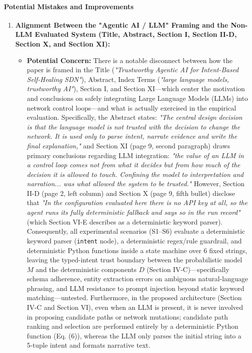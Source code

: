 \documentclass[11pt,a4paper]{article}
\begin{document}
\paragraph{Potential Mistakes and Improvements}
\begin{enumerate}[leftmargin=1.6em,itemsep=3pt]
\item \textbf{Alignment Between the "Agentic AI / LLM" Framing and the Non-LLM Evaluated System (Title, Abstract, Section I, Section II-D, Section X, and Section XI):}
\begin{itemize}[leftmargin=1.8em,itemsep=2pt]
\item \textbf{Potential Concern:} There is a notable disconnect between how the paper is framed in the Title (\emph{"Trustworthy Agentic AI for Intent-Based Self-Healing SDN"}), Abstract, Index Terms (\emph{"large language models, trustworthy AI"}), Section I, and Section XI—which center the motivation and conclusions on safely integrating Large Language Models (LLMs) into network control loops—and what is actually exercised in the empirical evaluation. Specifically, the Abstract states: \emph{"The central design decision is that the language model is not trusted with the decision to change the network. It is used only to parse intent, narrate evidence and write the final explanation,"} and Section XI (page 9, second paragraph) draws primary conclusions regarding LLM integration: \emph{"the value of an LLM in a control loop comes not from what it decides but from how much of the decision it is allowed to touch. Confining the model to interpretation and narration... was what allowed the system to be trusted."} However, Section II-D (page 2, left column) and Section X (page 9, fifth bullet) disclose that \emph{"In the configuration evaluated here there is no API key at all, so the agent runs its fully deterministic fallback and says so in the run record"} (which Section VI-E describes as a deterministic keyword parser). Consequently, all experimental scenarios (S1–S6) evaluate a deterministic keyword parser (\texttt{intent} node), a deterministic regex/rule guardrail, and deterministic Python functions inside a state machine over 6 fixed strings, leaving the typed-intent trust boundary between the probabilistic model $M$ and the deterministic components $D$ (Section IV-C)—specifically schema adherence, entity extraction errors on ambiguous natural-language phrasing, and LLM resistance to prompt injection beyond static keyword matching—untested. Furthermore, in the proposed architecture (Section IV-C and Section VI), even when an LLM is present, it is never involved in proposing candidate paths or network mutations; candidate path ranking and selection are performed entirely by a deterministic Python function (Eq. (6)), whereas the LLM only parses the initial string into a 5-tuple intent and formats narrative text.

\end{itemize}
\end{enumerate}
\end{document}
